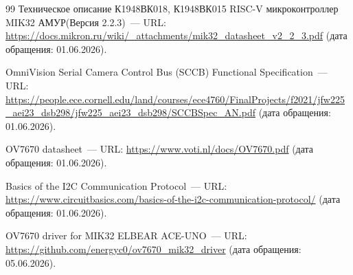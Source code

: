 \documentclass[a4paper]{article}
\begin{document}
\begin{thebibliography}{99}
Техническое описание К1948ВК018, К1948ВК015 RISC-V микроконтроллер MIK32 АМУР(Версия 2.2.3)~--- URL: \url{https://docs.mikron.ru/wiki/_attachments/mik32_datasheet_v2_2_3.pdf} (дата обращения: 01.06.2026).

 OmniVision Serial Camera Control Bus (SCCB)
Functional Specification~---  URL: \url{https://people.ece.cornell.edu/land/courses/ece4760/FinalProjects/f2021/jfw225_aei23_dsb298/jfw225_aei23_dsb298/SCCBSpec_AN.pdf} (дата обращения: 01.06.2026).

OV7670 datasheet~--- URL: \url{https://www.voti.nl/docs/OV7670.pdf} (дата обращения: 01.06.2026).

Basics of the I2C Communication Protocol~--- URL: \url{https://www.circuitbasics.com/basics-of-the-i2c-communication-protocol/} (дата обращения: 01.06.2026).

 OV7670 driver for MIK32 ELBEAR ACE-UNO~--- URL: \url{https://github.com/energyc0/ov7670_mik32_driver} (дата обращения: 05.06.2026).
 
\end{thebibliography}
\end{document}

